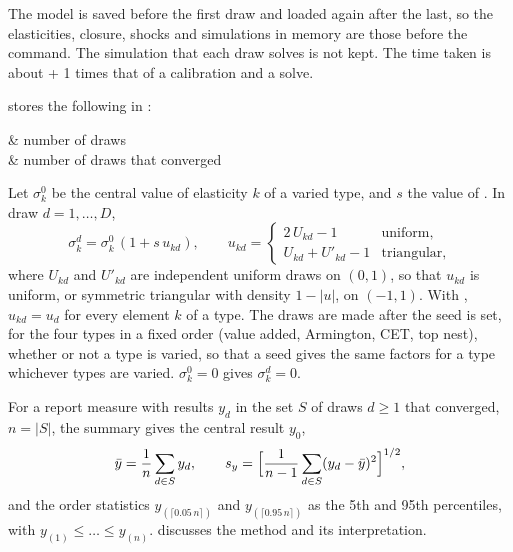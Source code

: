 
The model is saved before the first draw and loaded again after the last, so
the elasticities, closure, shocks and simulations in memory are those before
the command. The simulation that each draw solves is not kept. The time taken
is about \argu{\#} + 1 times that of a calibration and a solve.


 stores the following in :
\begin{storedres}
 & number of draws\\
 & number of draws that converged\\
\end{storedres}


Let $\sigma^0_k$ be the central value of elasticity $k$ of a varied type,
and $s$ the value of . In draw $d = 1, \dots, D$,
\begin{equation*}
\sigma^d_k = \sigma^0_k\,(1 + s\,u_{kd}), \qquad
u_{kd} =
\begin{cases}
2\,U_{kd} - 1 & \text{uniform},\\
U_{kd} + U'_{kd} - 1 & \text{triangular},
\end{cases}
\end{equation*}
where $U_{kd}$ and $U'_{kd}$ are independent uniform draws on $(0, 1)$, so
that $u_{kd}$ is uniform, or symmetric triangular with density $1 - |u|$, on
$(-1, 1)$. With , $u_{kd} = u_d$ for every element $k$ of a
type. The draws are made after the seed is set, for the four types in a
fixed order (value added, Armington, CET, top nest), whether or not a type is
varied, so that a seed gives the same factors for a type whichever types are
varied. $\sigma^0_k = 0$ gives $\sigma^d_k = 0$.

For a report measure with results $y_d$ in the set $S$ of draws $d \ge 1$
that converged, $n = |S|$, the summary gives the central result $y_0$,
\begin{equation*}
\bar y = \frac{1}{n}\sum_{d \in S} y_d, \qquad
s_y = \Bigl[\frac{1}{n-1}\sum_{d \in S} (y_d - \bar y)^2\Bigr]^{1/2},
\end{equation*}
and the order statistics $y_{(\lceil 0.05\,n\rceil)}$ and
$y_{(\lceil 0.95\,n\rceil)}$ as the 5th and 95th percentiles, with
$y_{(1)} \le \dots \le y_{(n)}$.  discusses the method
and its interpretation.


\begin{alsosee}
\end{alsosee}
